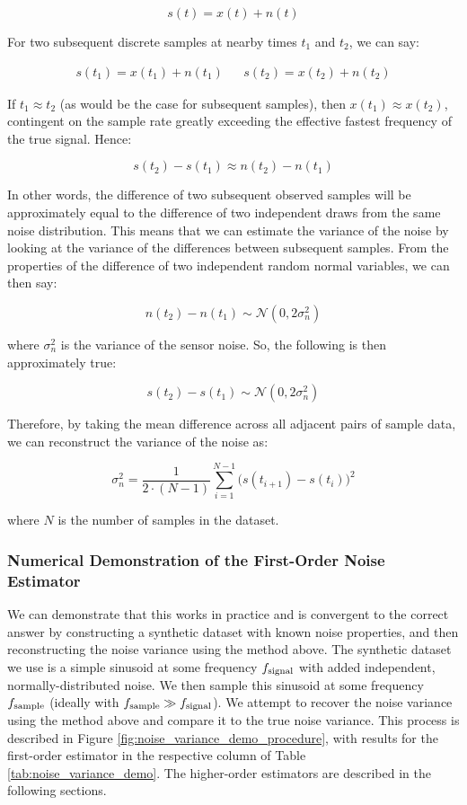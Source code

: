 \documentclass[conf]{new-aiaa}
\begin{document}
    $$s(t) = x(t) + n(t)$$ %

    \noindent For two subsequent discrete samples at nearby times $t_1$ and $t_2$, we can say:

    \begin{align*}
        s(t_1) = x(t_1) + n(t_1) &&
        s(t_2) = x(t_2) + n(t_2)
    \end{align*}

    \noindent If $t_1 \approx t_2$ (as would be the case for subsequent samples), then $x(t_1) \approx x(t_2)$, contingent on the sample rate greatly exceeding the effective fastest frequency of the true signal. Hence:

    $$s(t_2) - s(t_1) \approx n(t_2) - n(t_1)$$

    In other words, the difference of two subsequent observed samples will be approximately equal to the difference of two independent draws from the same noise distribution. This means that we can estimate the variance of the noise by looking at the variance of the differences between subsequent samples. From the properties of the difference of two independent random normal variables, we can then say:

    $$n(t_2) - n(t_1) \sim \mathcal{N}(0, 2\sigma^2_n)$$

    \noindent where $\sigma^2_n$ is the variance of the sensor noise. So, the following is then approximately true:

    $$s(t_2) - s(t_1) \sim \mathcal{N}(0, 2\sigma^2_n)$$

    Therefore, by taking the mean difference across all adjacent pairs of sample data, we can reconstruct the variance of the noise as:

    \begin{equation}
        \sigma^2_n = \frac{1}{2 \cdot (N-1)} \sum_{i=1}^{N-1} \Big( s(t_{i+1}) - s(t_i) \Big)^2
        \label{eq:1st_order_noise_estimator}
    \end{equation}

    \noindent where $N$ is the number of samples in the dataset.

    \subsubsection{Numerical Demonstration of the First-Order Noise Estimator}

    We can demonstrate that this works in practice and is convergent to the correct answer by constructing a synthetic dataset with known noise properties, and then reconstructing the noise variance using the method above. The synthetic dataset we use is a simple sinusoid at some frequency $f_{\rm signal}$ with added independent, normally-distributed noise. We then sample this sinusoid at some frequency $f_{\rm sample}$ (ideally with $f_{\rm sample} \gg f_{\rm signal}$). We attempt to recover the noise variance using the method above and compare it to the true noise variance. This process is described in Figure \ref{fig:noise_variance_demo_procedure}, with results for the first-order estimator in the respective column of Table \ref{tab:noise_variance_demo}. The higher-order estimators are described in the following sections.
\end{document}
